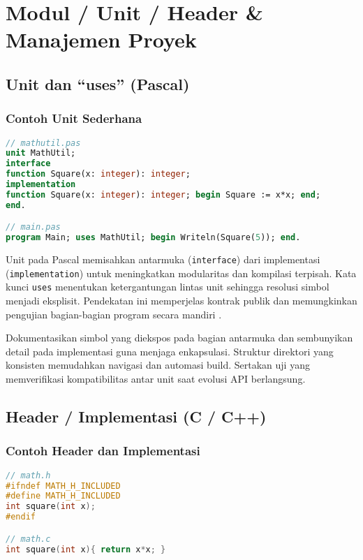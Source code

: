 \documentclass[../main.tex]{subfiles}
\begin{document}
\chapter{Modul / Unit / Header \& Manajemen Proyek}
\section{Unit dan ``uses'' (Pascal)}
\subsection{Contoh Unit Sederhana}
\begin{lstlisting}[language=Pascal, caption={Unit dan program utama (Pascal)}]
// mathutil.pas
unit MathUtil;
interface
function Square(x: integer): integer;
implementation
function Square(x: integer): integer; begin Square := x*x; end;
end.

// main.pas
program Main; uses MathUtil; begin Writeln(Square(5)); end.
\end{lstlisting}
Unit pada Pascal memisahkan antarmuka (\texttt{interface}) dari implementasi (\texttt{implementation}) untuk meningkatkan modularitas dan kompilasi terpisah. Kata kunci \texttt{uses} menentukan ketergantungan lintas unit sehingga resolusi simbol menjadi eksplisit. Pendekatan ini memperjelas kontrak publik dan memungkinkan pengujian bagian-bagian program secara mandiri \parencite{free-pascal-docs,pascal-tutorial-wikibooks}.

Dokumentasikan simbol yang diekspos pada bagian antarmuka dan sembunyikan detail pada implementasi guna menjaga enkapsulasi. Struktur direktori yang konsisten memudahkan navigasi dan automasi build. Sertakan uji yang memverifikasi kompatibilitas antar unit saat evolusi API berlangsung.

\section{Header / Implementasi (C / C++)}
\subsection{Contoh Header dan Implementasi}
\begin{lstlisting}[language=C, caption={Header dengan include guard dan implementasi C}]
// math.h
#ifndef MATH_H_INCLUDED
#define MATH_H_INCLUDED
int square(int x);
#endif

// math.c
int square(int x){ return x*x; }
\end{lstlisting}
\end{document}
